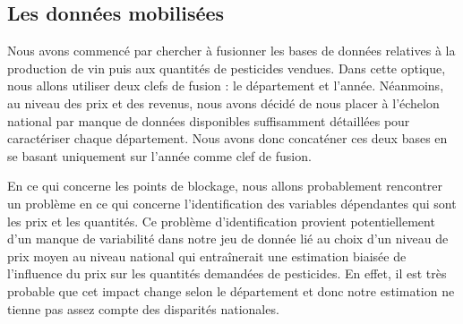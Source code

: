 \documentclass[11pt, a4paper]{article}
\begin{document}
\subsection*{Les données mobilisées}
Nous avons commencé par chercher à fusionner les bases de données relatives à la production de vin puis aux quantités de pesticides vendues. 
Dans cette optique, nous allons utiliser deux clefs de fusion : le département et l’année. 
Néanmoins, au niveau des prix et des revenus, nous avons décidé de nous placer à l’échelon national par manque de données disponibles suffisamment détaillées pour caractériser chaque département. 
Nous avons donc concaténer ces deux bases en se basant uniquement sur l’année comme clef de fusion.
\par
En ce qui concerne les points de blockage, nous allons probablement rencontrer un problème en ce qui concerne l’identification des variables dépendantes qui sont les prix et les quantités. 
Ce problème d’identification provient potentiellement d’un manque de variabilité dans notre jeu de donnée lié au choix d’un niveau de prix moyen au niveau  national  qui entraînerait une estimation biaisée de l’influence du prix sur les quantités demandées de pesticides. 
En effet, il est très probable que cet impact change selon le département et donc notre estimation ne tienne pas assez compte des disparités nationales.
\end{document}
